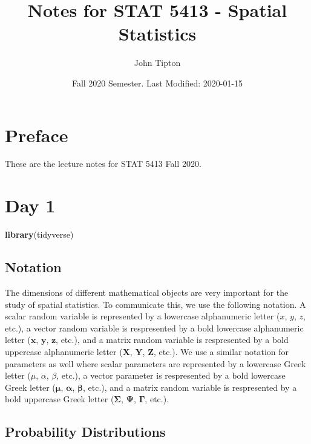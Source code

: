 \documentclass[]{book}
\title{Notes for STAT 5413 - Spatial Statistics}
\author{John Tipton}
\date{Fall 2020 Semester. Last Modified: 2020-01-15}
\newenvironment{Shaded}{\begin{snugshade}}{\end{snugshade}}
\newcommand{\KeywordTok}[1]{\textcolor[rgb]{0.13,0.29,0.53}{\textbf{#1}}}
\newcommand{\NormalTok}[1]{#1}
\begin{document}
\maketitle

{
\setcounter{tocdepth}{1}
\tableofcontents
}
\hypertarget{preface}{%
\chapter*{Preface}\label{preface}}

These are the lecture notes for STAT 5413 Fall 2020.

\hypertarget{day-1}{%
\chapter{Day 1}\label{day-1}}

\begin{Shaded}
\begin{Highlighting}[]
\KeywordTok{library}\NormalTok{(tidyverse)}
\end{Highlighting}
\end{Shaded}

\hypertarget{notation}{%
\section{Notation}\label{notation}}

The dimensions of different mathematical objects are very important for the study of spatial statistics. To communicate this, we use the following notation. A scalar random variable is represented by a lowercase alphanumeric letter (\(x\), \(y\), \(z\), etc.), a vector random variable is respresented by a bold lowercase alphanumeric letter (\(\mathbf{x}\), \(\mathbf{y}\), \(\mathbf{z}\), etc.), and a matrix random variable is respresented by a bold uppercase alphanumeric letter (\(\mathbf{X}\), \(\mathbf{Y}\), \(\mathbf{Z}\), etc.). We use a similar notation for parameters as well where scalar parameters are represented by a lowercase Greek letter (\(\mu\), \(\alpha\), \(\beta\), etc.), a vector parameter is respresented by a bold lowercase Greek letter (\(\boldsymbol{\mu}\), \(\boldsymbol{\alpha}\), \(\boldsymbol{\beta}\), etc.), and a matrix random variable is respresented by a bold uppercase Greek letter (\(\boldsymbol{\Sigma}\), \(\boldsymbol{\Psi}\), \(\boldsymbol{\Gamma}\), etc.).

\hypertarget{probability-distributions}{%
\section{Probability Distributions}\label{probability-distributions}}
\end{document}

